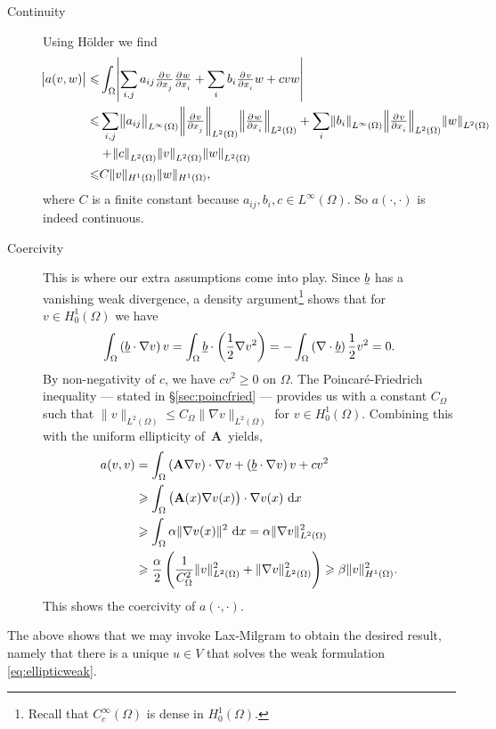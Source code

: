 \documentclass[thesis.tex]{subfiles}
\begin{document}
\begin{description}
  \item[Continuity]Using H\"older we find
    \begin{align*}
      \abs{a(v,w)} \leq &\int_\Omega \abs{\sum_{i,j} a_{ij} \pd{v}{x_j}\pd{w}{x_i}  + \sum_i b_i \pd{v}{x_i}w + cvw}\\
                   \leq &\sum_{i,j} \norm{ a_{ij}}_{L^\infty(\Omega)} \norm{ \pd{v}{x_j}}_{L^2(\Omega)} \norm{ \pd{w}{x_i}}_{L^2(\Omega)} + \sum_i \norm{b_i}_{L^\infty(\Omega)} \norm{\pd{v}{x_i}}_{L^2(\Omega)} \norm{w}_{L^2(\Omega)} \\
                   &+ \norm{c}_{L^2(\Omega)} \norm{v}_{L^2(\Omega)} \norm{w}_{L^2(\Omega)} \\
                   \leq &C \|v\|_{H^1(\Omega)} \|w\|_{H^1(\Omega)},
    \end{align*}
    where $C$ is a finite constant because $a_{ij}, b_i, c \in L^\infty(\Omega)$. So $a(\cdot,\cdot)$ is indeed continuous.
  \item[Coercivity] This is where our extra assumptions come into play. Since $\underline{b}$ has a vanishing weak divergence, a density argument\footnote{Recall that $C_c^\infty(\Omega)$ is dense in $H_0^1(\Omega)$.} shows that for $v \in H_0^1(\Omega)$ we have
    \[
      \int_\Omega \left(\underline{b} \cdot \nabla v\right)v  = \int_\Omega \underline{b} \cdot \left({1 \over 2} \nabla v^2\right) = - \int_\Omega \left(\nabla \cdot \underline{b} \right) {1 \over 2} v^2 = 0.
    \]
    By non-negativity of $c$, we have $cv^2 \geq 0$ on $\Omega$. 
    The Poincar\'e-Friedrich  inequality --- stated in \S\ref{sec:poincfried} --- provides us with a constant $C_\Omega$ such that ${\|v\|_{L^2(\Omega)} \leq C_\Omega \|\nabla v\|_{L^2(\Omega)}}$ for $v \in H_0^1(\Omega)$. Combining this with the uniform ellipticity of~$\mathbf{A}$~yields,
    \begin{align*}
      a(v,v) &= \int_\Omega \left(\mathbf{A} \nabla v\right) \cdot \nabla v + \left(\v{b} \cdot \nabla v\right)v + cv^2 \\
      &\geq  \int_\Omega \left(\mathbf{A}(x) \nabla v(x)\right) \cdot \nabla v(x)\, \dif x \\
             &\geq  \int_\Omega \alpha \|\nabla v(x)\|^2\, \dif x = \alpha \|\nabla v\|^2_{L^2(\Omega)}\\
             &\geq \frac{\alpha}{2} \left(\frac{1}{C^2_\Omega} \|v\|^2_{L^2(\Omega)} + \|\nabla v\|^2_{L^2(\Omega)}\right) \geq \beta \|v\|^2_{H^1(\Omega)}.
    \end{align*}
    This shows the coercivity of $a(\cdot, \cdot)$.
\end{description}
The above shows that we may invoke Lax-Milgram to obtain the desired result,
namely that there is a unique $u \in V$ that solves the weak formulation \eqref{eq:ellipticweak}. 
\end{document}
